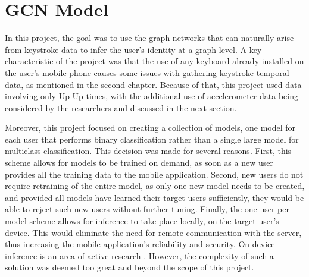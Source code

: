 \chapter{GCN Model}

In this project, the goal was to use the graph networks that can naturally arise from keystroke data to infer the user's identity at a graph level. A key characteristic of the project was that the use of any keyboard already installed on the user's mobile phone causes some issues with gathering keystroke temporal data, as mentioned in the second chapter. Because of that, this project used data involving only Up-Up times, with the additional use of accelerometer data being considered by the researchers and discussed in the next section.

Moreover, this project focused on creating a collection of models, one model for each user that performs binary classification rather than a single large model for multiclass classification. This decision was made for several reasons. First, this scheme allows for models to be trained on demand, as soon as a new user provides all the training data to the mobile application. Second, new users do not require retraining of the entire model, as only one new model needs to be created, and provided all models have learned their target users sufficiently, they would be able to reject such new users without further tuning. Finally, the one user per model scheme allows for inference to take place locally, on the target user's device. This would eliminate the need for remote communication with the server, thus increasing the mobile application's reliability and security. On-device inference is an area of active research \cite{48305}. However, the complexity of such a solution was deemed too great and beyond the scope of this project.
